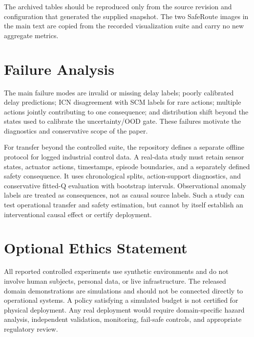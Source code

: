 \documentclass[10pt]{article}
\begin{document}
The archived tables should be reproduced only from the source revision and
configuration that generated the supplied snapshot. The two SafeRoute images
in the main text are copied from the recorded visualization suite and carry no
new aggregate metrics.

\section{Failure Analysis}
The main failure modes are invalid or missing delay labels; poorly calibrated
delay predictions; ICN disagreement with SCM labels for rare actions; multiple
actions jointly contributing to one consequence; and distribution shift beyond
the states used to calibrate the uncertainty/OOD gate. These failures motivate
the diagnostics and conservative scope of the paper.

For transfer beyond the controlled suite, the repository defines a separate
offline protocol for logged industrial control data. A real-data study must
retain sensor states, actuator actions, timestamps, episode boundaries, and a
separately defined safety consequence. It uses chronological splits,
action-support diagnostics, and conservative fitted-Q evaluation with
bootstrap intervals. Observational anomaly labels are treated as consequences,
not as causal source labels. Such a study can test operational transfer and
safety estimation, but cannot by itself establish an interventional causal
effect or certify deployment.

\section{Optional Ethics Statement}
All reported controlled experiments use synthetic environments and do not
involve human subjects, personal data, or live infrastructure. The released
domain demonstrations are simulations and should not be connected directly to
operational systems. A policy satisfying a simulated budget is not certified
for physical deployment. Any real deployment would require domain-specific
hazard analysis, independent validation, monitoring, fail-safe controls, and
appropriate regulatory review.
\end{document}
